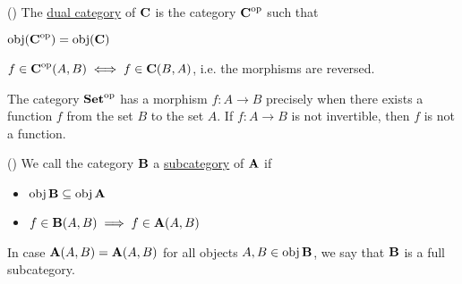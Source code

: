 \begin{definition}\label{def:dual_category}(\cite[construction 1.1.9]{Leinster2014})
  The \uline{dual category} of $\operatorname{\mathbf{C}}$ is the category $\operatorname{\mathbf{C}}^{\operatorname{op}}$ such that
  \begin{defenum}
    \item $\operatorname{obj}(\operatorname{\mathbf{C}}^{\operatorname{op}}) = \operatorname{obj}(\operatorname{\mathbf{C}})$
    \item $f \in \operatorname{\mathbf{C}}^{\operatorname{op}}(A, B) \iff f \in \operatorname{\mathbf{C}}(B, A)$, i.e. the morphisms are reversed.
  \end{defenum}
\end{definition}

\begin{example}
  The category $\operatorname{\mathbf{Set}}^{\operatorname{op}}$ has a morphism $f: A \to B$ precisely when there exists a function $f$ from the set $B$ to the set $A$. If $f: A \to B$ is not invertible, then $f$ is not a function.
\end{example}

\begin{definition}\label{def:subcategory}(\cite[definition 1.2.18]{Leinster2014})
  We call the category $\operatorname{\mathbf{B}}$ a \uline{subcategory} of $\operatorname{\mathbf{A}}$ if
  \begin{itemize}
    \item $\operatorname{obj} \operatorname{\mathbf{B}} \subseteq \operatorname{obj} \operatorname{\mathbf{A}}$
    \item $f \in \operatorname{\mathbf{B}}(A, B) \implies f \in \operatorname{\mathbf{A}}(A, B)$
  \end{itemize}

  In case $\operatorname{\mathbf{A}}(A, B) = \operatorname{\mathbf{A}}(A, B)$ for all objects $A, B \in \operatorname{obj} \operatorname{\mathbf{B}}$, we say that $\operatorname{\mathbf{B}}$ is a full subcategory.
\end{definition}
